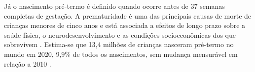 

Já o nascimento pré-termo é definido quando ocorre antes de 37 semanas completas de gestação. A prematuridade é uma das principais causas de morte de crianças menores de cinco anos e está associada a efeitos de longo prazo sobre a saúde física, o neurodesenvolvimento e as condições socioeconômicas dos que sobrevivem \cite{ohuma2023}. Estima-se que 13,4 milhões de crianças nasceram pré-termo no mundo em 2020, 9,9\% de todos os nascimentos, sem mudança mensurável em relação a 2010 \cite{ohuma2023}.


